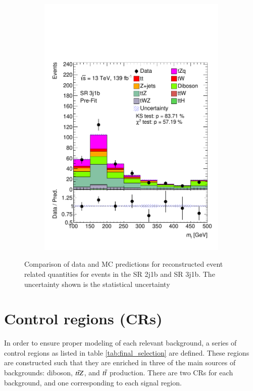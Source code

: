 \begin{figure}[h!]
\begin{subfigure}[b]{0.33\linewidth}
    \includegraphics[width=\linewidth]{ubonn-thesis/Chapters/Chapters_05/Figure/SR/SR_3j1b_Top_mass.pdf} 
  \end{subfigure} 
  \caption{Comparison of data and MC predictions for reconstructed event related quantities for events in the SR 2j1b and SR 3j1b. The uncertainty shown is the statistical uncertainty}
  \label{fig:signal} 
\end{figure}






\section{Control regions (CRs)}
\label{sec:CR}

In order to ensure proper modeling of each relevant background, a series of control regions as listed in table \ref{tab:final_selection} are defined. These regions are constructed such that they are enriched in three of the main sources of backgrounds: diboson, $t\Bar{t}Z$, and $t\Bar{t}$ production. There are two CRs for each background, and one corresponding to each signal region.

